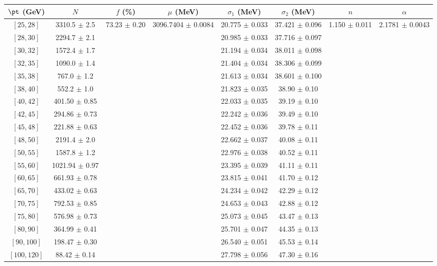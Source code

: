 \begin{tabular}{c||c|c|c|c|c|c|c}
$\pt$ (GeV) & $N$ & $f$ (\%) & $\mu$ (MeV) & $\sigma_1$ (MeV) & $\sigma_2$ (MeV) & $n$ & $\alpha$ \\
\hline
$[25, 28]$ & 3310.5 $\pm$ 2.5 & \multirow{19}{*}{73.23 $\pm$ 0.20} & \multirow{19}{*}{3096.7404 $\pm$ 0.0084} & 20.775 $\pm$ 0.033 & 37.421 $\pm$ 0.096 & \multirow{19}{*}{1.150 $\pm$ 0.011} & \multirow{19}{*}{2.1781 $\pm$ 0.0043}\\
$[28, 30]$ & 2294.7 $\pm$ 2.1 &  &  & 20.985 $\pm$ 0.033 & 37.716 $\pm$ 0.097 &  & \\
$[30, 32]$ & 1572.4 $\pm$ 1.7 &  &  & 21.194 $\pm$ 0.034 & 38.011 $\pm$ 0.098 &  & \\
$[32, 35]$ & 1090.0 $\pm$ 1.4 &  &  & 21.404 $\pm$ 0.034 & 38.306 $\pm$ 0.099 &  & \\
$[35, 38]$ & 767.0 $\pm$ 1.2 &  &  & 21.613 $\pm$ 0.034 & 38.601 $\pm$ 0.100 &  & \\
$[38, 40]$ & 552.2 $\pm$ 1.0 &  &  & 21.823 $\pm$ 0.035 & 38.90 $\pm$ 0.10 &  & \\
$[40, 42]$ & 401.50 $\pm$ 0.85 &  &  & 22.033 $\pm$ 0.035 & 39.19 $\pm$ 0.10 &  & \\
$[42, 45]$ & 294.86 $\pm$ 0.73 &  &  & 22.242 $\pm$ 0.036 & 39.49 $\pm$ 0.10 &  & \\
$[45, 48]$ & 221.88 $\pm$ 0.63 &  &  & 22.452 $\pm$ 0.036 & 39.78 $\pm$ 0.11 &  & \\
$[48, 50]$ & 2191.4 $\pm$ 2.0 &  &  & 22.662 $\pm$ 0.037 & 40.08 $\pm$ 0.11 &  & \\
$[50, 55]$ & 1587.8 $\pm$ 1.2 &  &  & 22.976 $\pm$ 0.038 & 40.52 $\pm$ 0.11 &  & \\
$[55, 60]$ & 1021.94 $\pm$ 0.97 &  &  & 23.395 $\pm$ 0.039 & 41.11 $\pm$ 0.11 &  & \\
$[60, 65]$ & 661.93 $\pm$ 0.78 &  &  & 23.815 $\pm$ 0.041 & 41.70 $\pm$ 0.12 &  & \\
$[65, 70]$ & 433.02 $\pm$ 0.63 &  &  & 24.234 $\pm$ 0.042 & 42.29 $\pm$ 0.12 &  & \\
$[70, 75]$ & 792.53 $\pm$ 0.85 &  &  & 24.653 $\pm$ 0.043 & 42.88 $\pm$ 0.12 &  & \\
$[75, 80]$ & 576.98 $\pm$ 0.73 &  &  & 25.073 $\pm$ 0.045 & 43.47 $\pm$ 0.13 &  & \\
$[80, 90]$ & 364.99 $\pm$ 0.41 &  &  & 25.701 $\pm$ 0.047 & 44.35 $\pm$ 0.13 &  & \\
$[90, 100]$ & 198.47 $\pm$ 0.30 &  &  & 26.540 $\pm$ 0.051 & 45.53 $\pm$ 0.14 &  & \\
$[100, 120]$ & 88.42 $\pm$ 0.14 &  &  & 27.798 $\pm$ 0.056 & 47.30 $\pm$ 0.16 &  & \\
\end{tabular}
